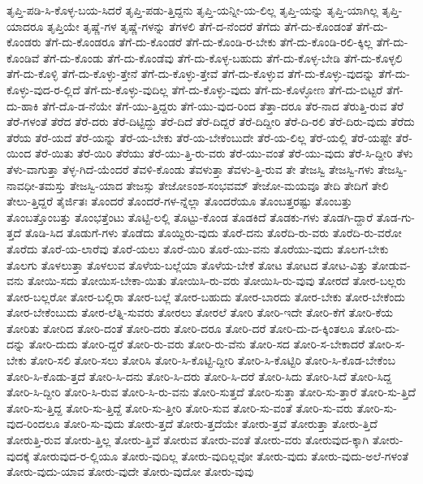 {ತೃಪ್ತಿ-ಪಡಿ-ಸಿ-ಕೊಳ್ಳ-ಬಯ-ಸಿದರೆ
ತೃಪ್ತಿ-ಪಡು-ತ್ತಿದ್ದನು
ತೃಪ್ತಿ-ಯನ್ನೀ-ಯ-ಲಿಲ್ಲ
ತೃಪ್ತಿ-ಯನ್ನು
ತೃಪ್ತಿ-ಯಾಗಿಲ್ಲ
ತೃಪ್ತಿ-ಯಾದರೂ
ತೃಪ್ತಿಯೇ
ತೃಷ್ಣೆ-ಗಳ
ತೃಷ್ಣೆ-ಗಳನ್ನು
ತೆಗಳಲಿ
ತೆಗೆ-ದ-ನೆಂದರೆ
ತೆಗೆದು
ತೆಗೆ-ದು-ಕೊಂಡಂತೆ
ತೆಗೆ-ದು-ಕೊಂಡರು
ತೆಗೆ-ದು-ಕೊಂಡರೂ
ತೆಗೆ-ದು-ಕೊಂಡರೆ
ತೆಗೆ-ದು-ಕೊಂಡಿ-ರ-ಬೇಕು
ತೆಗೆ-ದು-ಕೊಂಡಿ-ರಲಿ-ಕ್ಕಿಲ್ಲ
ತೆಗೆ-ದು-ಕೊಂಡಿವೆ
ತೆಗೆ-ದು-ಕೊಂಡು
ತೆಗೆ-ದು-ಕೊಂಡೆವು
ತೆಗೆ-ದು-ಕೊಳ್ಳ-ಬಹುದು
ತೆಗೆ-ದು-ಕೊಳ್ಳ-ಬೇಡಿ
ತೆಗೆ-ದು-ಕೊಳ್ಳಲಿ
ತೆಗೆ-ದು-ಕೊಳ್ಳಿ
ತೆಗೆ-ದು-ಕೊಳ್ಳು-ತ್ತೇನೆ
ತೆಗೆ-ದು-ಕೊಳ್ಳು-ತ್ತೇವೆ
ತೆಗೆ-ದು-ಕೊಳ್ಳುವ
ತೆಗೆ-ದು-ಕೊಳ್ಳು-ವುದನ್ನು
ತೆಗೆ-ದು-ಕೊಳ್ಳು-ವುದ-ರ-ಲ್ಲಿದೆ
ತೆಗೆ-ದು-ಕೊಳ್ಳು-ವುದಿಲ್ಲ
ತೆಗೆ-ದು-ಕೊಳ್ಳು-ವುದು
ತೆಗೆ-ದು-ಕೊಳ್ಳೋಣ
ತೆಗೆ-ದು-ಬಿಟ್ಟರೆ
ತೆಗೆ-ದು-ಹಾಕಿ
ತೆಗೆ-ದೊ-ಡ-ನೆಯೇ
ತೆಗೆ-ಯು-ತ್ತಿದ್ದರು
ತೆಗೆ-ಯು-ವುದ-ರಿಂದ
ತೆತ್ತಾ-ದರೂ
ತೆರ-ನಾದ
ತೆರುತ್ತಿ-ರುವ
ತೆರೆ
ತೆರೆ-ಗಳಂತೆ
ತೆರೆದ
ತೆರೆ-ದರು
ತೆರೆ-ದಿಟ್ಟಿದ್ದು
ತೆರೆ-ದಿದೆ
ತೆರೆ-ದಿದ್ದರೆ
ತೆರೆ-ದಿದ್ದೀರಿ
ತೆರೆ-ದಿ-ರಲಿ
ತೆರೆ-ದಿರು-ವುದು
ತೆರೆದು
ತೆರೆಯ
ತೆರೆ-ಯದೆ
ತೆರೆ-ಯನ್ನು
ತೆರೆ-ಯ-ಬೇಕು
ತೆರೆ-ಯ-ಬೇಕೆಂಬುದೇ
ತೆರೆ-ಯ-ಲಿಲ್ಲ
ತೆರೆ-ಯಲ್ಲಿ
ತೆರೆ-ಯಷ್ಟೇ
ತೆರೆ-ಯಿಂದ
ತೆರೆ-ಯಿತು
ತೆರೆ-ಯಿರಿ
ತೆರೆಯು
ತೆರೆ-ಯು-ತ್ತಿ-ರು-ವರು
ತೆರೆ-ಯು-ವಂತೆ
ತೆರೆ-ಯು-ವುದು
ತೆರೆ-ಸಿ-ದ್ದೀರಿ
ತೆಳು
ತೆಳು-ವಾಗುತ್ತಾ
ತೆಳ್ಳ-ಗಿದೆ-ಯೆಂದರೆ
ತೆವಳಿ-ಕೊಂಡು
ತೆವಳುತ್ತಾ
ತೆವಳು-ತ್ತಿ-ರುವ
ತೇ
ತೇಜಸ್ವಿ
ತೇಜಸ್ವಿ-ಗಳು
ತೇಜಸ್ವಿ-ನಾವಧೀ-ತಮಸ್ತು
ತೇಜಸ್ವಿ-ಯಾದ
ತೇಜಸ್ಸು
ತೇಜೋಽಂಶ-ಸಂಭವಮ್
ತೇಜೋ-ಮಯವೂ
ತೇದಿ
ತೇದಿಗೆ
ತೇಲಿ
ತೇಲು-ತ್ತಿದ್ದರೆ
ತೈರ್ಜಿತಃ
ತೊಂದರೆ
ತೊಂದರೆ-ಗಳ-ನ್ನೆಲ್ಲಾ
ತೊಂದರೆಯೂ
ತೊಂಬತ್ತರಷ್ಟು
ತೊಂಬತ್ತು
ತೊಂಬತ್ತೊಂಬತ್ತು
ತೊಂಭತ್ತೆಂಟು
ತೊಟ್ಟಿ-ಲಲ್ಲಿ
ತೊಟ್ಟು-ಕೊಂಡ
ತೊಡಕಿದೆ
ತೊಡಕು-ಗಳು
ತೊಡಗಿ-ದ್ದಾರೆ
ತೊಡ-ಗು-ತ್ತದೆ
ತೊಡಿ-ಸಿದ
ತೊಡುಗೆ-ಗಳು
ತೊಡೆದು
ತೊಯ್ದಿರು-ವುದು
ತೊರೆ-ದನು
ತೊರೆದಿ-ರು-ವರು
ತೊರೆದಿ-ರು-ವರೋ
ತೊರೆದು
ತೊರೆ-ಯ-ಲಾರೆವು
ತೊರೆ-ಯಲು
ತೊರೆ-ಯಿರಿ
ತೊರೆ-ಯು-ವನು
ತೊರೆಯು-ವುದು
ತೊಲಗ-ಬೇಕು
ತೊಲಗು
ತೊಳಲುತ್ತಾ
ತೊಳಲುವ
ತೊಳೆಯ-ಬಲ್ಲೆಯಾ
ತೊಳೆಯ-ಬೇಕೆ
ತೋಟ
ತೋಟದ
ತೋಟ-ವಿತ್ತು
ತೋಡುವ-ವನು
ತೋಯಿ-ಸದು
ತೋಯಿಸ-ಬೇಕಾ-ಯಿತು
ತೋಯಿಸಿ-ರು-ವರು
ತೋಯಿಸಿ-ರು-ವುವು
ತೋರದೆ
ತೋರ-ಬಲ್ಲರು
ತೋರ-ಬಲ್ಲರೋ
ತೋರ-ಬಲ್ಲಿರಾ
ತೋರ-ಬಲ್ಲೆ
ತೋರ-ಬಹುದು
ತೋರ-ಬಾರದು
ತೋರ-ಬೇಕು
ತೋರ-ಬೇಕೆಂದು
ತೋರ-ಬೇಕೆಂಬುದು
ತೋರ-ಲೆತ್ನಿ-ಸುವರು
ತೋರಲು
ತೋರಲೆ
ತೋರಿ
ತೋರಿ-ಇದೇ
ತೋರಿ-ಕೆಗೆ
ತೋರಿ-ಕೆಯ
ತೋರಿತು
ತೋರಿದ
ತೋರಿ-ದಂತೆ
ತೋರಿ-ದರು
ತೋರಿ-ದರೂ
ತೋರಿ-ದರೆ
ತೋರಿ-ದು-ದ-ಕ್ಕಿಂತಲೂ
ತೋರಿ-ದು-ದನ್ನು
ತೋರಿ-ದುದು
ತೋರಿ-ದ್ದರೆ
ತೋರಿ-ರು-ವರು
ತೋರಿ-ರು-ವೆನು
ತೋರಿ-ಸದ
ತೋರಿ-ಸ-ಬೇಕಾದರೆ
ತೋರಿ-ಸ-ಬೇಕು
ತೋರಿ-ಸಲಿ
ತೋರಿ-ಸಲು
ತೋರಿಸಿ
ತೋರಿ-ಸಿ-ಕೊಟ್ಟಿ-ದ್ದೀರಿ
ತೋರಿ-ಸಿ-ಕೊಟ್ಟಿರಿ
ತೋರಿ-ಸಿ-ಕೊಡ-ಬೇಕೆಂಬ
ತೋರಿ-ಸಿ-ಕೊಡು-ತ್ತದೆ
ತೋರಿ-ಸಿ-ದನು
ತೋರಿ-ಸಿ-ದರು
ತೋರಿ-ಸಿ-ದರೆ
ತೋರಿ-ಸಿದು
ತೋರಿ-ಸಿದೆ
ತೋರಿ-ಸಿದ್ದ
ತೋರಿ-ಸಿ-ದ್ದೀರಿ
ತೋರಿ-ಸಿ-ರುವ
ತೋರಿ-ಸಿ-ರು-ವನು
ತೋರಿ-ಸುತ್ತದೆ
ತೋರಿ-ಸುತ್ತಾ
ತೋರಿ-ಸು-ತ್ತಾರೆ
ತೋರಿ-ಸು-ತ್ತಿದೆ
ತೋರಿ-ಸು-ತ್ತಿದ್ದ
ತೋರಿ-ಸು-ತ್ತಿದ್ದೆ
ತೋರಿ-ಸು-ತ್ತೀರಿ
ತೋರಿ-ಸುವ
ತೋರಿ-ಸು-ವಂತೆ
ತೋರಿ-ಸು-ವರು
ತೋರಿ-ಸು-ವುದ-ರಿಂದಲೂ
ತೋರಿ-ಸು-ವುದು
ತೋರು-ತ್ತದೆ
ತೋರು-ತ್ತದೆಯೇ
ತೋರು-ತ್ತವೆ
ತೋರುತ್ತಾ
ತೋರು-ತ್ತಿದೆ
ತೋರುತ್ತಿ-ರುವ
ತೋರು-ತ್ತಿಲ್ಲ
ತೋರು-ತ್ತಿವೆ
ತೋರುವ
ತೋರು-ವಂತೆ
ತೋರು-ವರು
ತೋರುವುದ-ಕ್ಕಾಗಿ
ತೋರು-ವುದಕ್ಕೆ
ತೋರುವುದ-ರ-ಲ್ಲಿಯೂ
ತೋರು-ವುದಿಲ್ಲ
ತೋರು-ವುದಿಲ್ಲವೋ
ತೋರು-ವುದು
ತೋರು-ವುದು-ಅಲೆ-ಗಳಂತೆ
ತೋರು-ವುದು-ಯಾವ
ತೋರು-ವುದೇ
ತೋರು-ವುದೋ
ತೋರು-ವುವು
}
